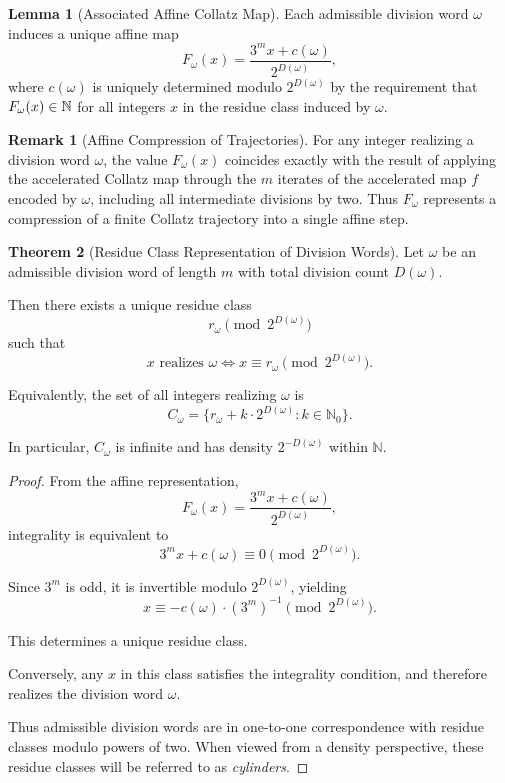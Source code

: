 \documentclass[12pt, oneside]{article}   	%
\numberwithin{equation}{section}          %
\theoremstyle{definition}
\newtheorem{theorem}{Theorem}
\newtheorem{lemma}[theorem]{Lemma}
\newtheorem*{remark}{Remark}
\begin{document}
\begin{lemma}[Associated Affine Collatz Map]
\label{lem:associated-map}
Each admissible division word $\omega$ induces a unique affine map
\[
F_\omega(x) = \frac{3^m x + c(\omega)}{2^{D(\omega)}},
\]
where $c(\omega)$ is uniquely determined modulo $2^{D(\omega)}$ by the
requirement that $F_\omega(x)\in\mathbb{N}$ for all integers $x$ in the residue class
induced by $\omega$.
\end{lemma}

\begin{remark}[Affine Compression of Trajectories]
For any integer realizing a division word $\omega$, the value $F_\omega(x)$
coincides exactly with the result of applying the accelerated Collatz map
through the $m$ iterates of the accelerated map $f$ encoded by $\omega$,
including all intermediate divisions by two. Thus $F_\omega$ represents a
compression of a finite Collatz trajectory into a single affine step.
\end{remark}

\newpage
\begin{theorem}[Residue Class Representation of Division Words]
\label{thm:cylinder}
Let $\omega$ be an admissible division word of length $m$ with total division count $D(\omega)$.

Then there exists a unique residue class
\[
r_\omega \pmod{2^{D(\omega)}}
\]
such that
\[
x \text{ realizes } \omega \iff x \equiv r_\omega \pmod{2^{D(\omega)}}.
\]

Equivalently, the set of all integers realizing $\omega$ is
\[
C_\omega = \{ r_\omega + k \cdot 2^{D(\omega)} : k \in \mathbb{N}_0 \}.
\]

In particular, $C_\omega$ is infinite and has density $2^{-D(\omega)}$
within $\mathbb{N}$.
\end{theorem}

\begin{proof}
From the affine representation,
\[
F_\omega(x) = \frac{3^m x + c(\omega)}{2^{D(\omega)}},
\]
integrality is equivalent to
\[
3^m x + c(\omega) \equiv 0 \pmod{2^{D(\omega)}}.
\]

Since $3^m$ is odd, it is invertible modulo $2^{D(\omega)}$, yielding
\[
x \equiv -c(\omega) \cdot (3^m)^{-1} \pmod{2^{D(\omega)}}.
\]

This determines a unique residue class.

Conversely, any $x$ in this class satisfies the integrality condition,
and therefore realizes the division word $\omega$.

Thus admissible division words are in one-to-one correspondence with residue
classes modulo powers of two. When viewed from a density perspective, these
residue classes will be referred to as \emph{cylinders}.
\end{proof}
\end{document}
